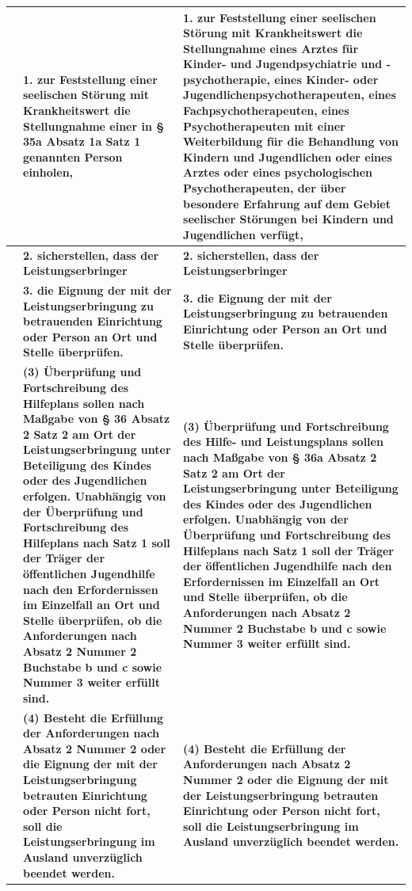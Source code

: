 \documentclass[10pt,a4paper,landscape]{article}
\begin{document}
\begin{longtable}{|L{8.6cm}|L{8.6cm}|L{8.6cm}|}
\hline
 & \textbf{1. zur Feststellung einer seelischen Störung mit Krankheitswert die Stellungnahme einer in \S{} 35a Absatz 1a Satz 1 genannten Person einholen, } & \textbf{1. zur Feststellung einer seelischen Störung mit Krankheitswert die Stellungnahme eines Arztes für Kinder- und Jugendpsychiatrie und - \newline psychotherapie, eines Kinder- oder Jugendlichenpsychotherapeuten, eines Fachpsychotherapeuten, eines Psychotherapeuten mit einer Weiterbildung für die Behandlung von Kindern und Jugendlichen oder eines Arztes oder eines psychologischen Psychotherapeuten, der über besondere Erfahrung auf dem Gebiet seelischer Störungen bei Kindern und Jugendlichen verfügt, } \\
\hline
 & \textbf{2. sicherstellen, dass der Leistungserbringer } & \textbf{2. sicherstellen, dass der Leistungserbringer } \\
\hline
 & \textbf{3. die Eignung der mit der Leistungserbringung zu betrauenden Einrichtung oder Person an Ort und Stelle überprüfen. } & \textbf{3. die Eignung der mit der Leistungserbringung zu betrauenden Einrichtung oder Person an Ort und Stelle überprüfen. } \\
\hline
 & \textbf{(3) Überprüfung und Fortschreibung des Hilfeplans sollen nach Maßgabe von \S{} 36 Absatz 2 Satz 2 am Ort der Leistungserbringung unter Beteiligung des Kindes oder des Jugendlichen erfolgen. Unabhängig von der Überprüfung und Fortschreibung des Hilfeplans nach Satz 1 soll der Träger der öffentlichen Jugendhilfe nach den Erfordernissen im Einzelfall an Ort und Stelle überprüfen, ob die Anforderungen nach Absatz 2 Nummer 2 Buchstabe b und c sowie Nummer 3 weiter erfüllt sind. } & \textbf{(3) Überprüfung und Fortschreibung des Hilfe- und Leistungsplans sollen nach Maßgabe von \S{} 36a Absatz 2 Satz 2 am Ort der Leistungserbringung unter Beteiligung des Kindes oder des Jugendlichen erfolgen. Unabhängig von der Überprüfung und Fortschreibung des Hilfeplans nach Satz 1 soll der Träger der öffentlichen Jugendhilfe nach den Erfordernissen im Einzelfall an Ort und Stelle überprüfen, ob die Anforderungen nach Absatz 2 Nummer 2 Buchstabe b und c sowie Nummer 3 weiter erfüllt sind. } \\
\hline
 & \textbf{(4) Besteht die Erfüllung der Anforderungen nach Absatz 2 Nummer 2 oder die Eignung der mit der Leistungserbringung betrauten Einrichtung oder Person nicht fort, soll die Leistungserbringung im Ausland unverzüglich beendet werden. } & \textbf{(4) Besteht die Erfüllung der Anforderungen nach Absatz 2 Nummer 2 oder die Eignung der mit der Leistungserbringung betrauten Einrichtung oder Person nicht fort, soll die Leistungserbringung im Ausland unverzüglich beendet werden. } \\

\end{longtable}
\end{document}
